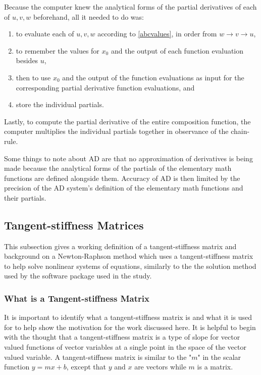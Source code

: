 \documentclass[preprint,12pt]{elsarticle}
\begin{document}
Because the computer knew the analytical forms of the partial derivatives of each of $u,v,w$ beforehand,
all it needed to do was:
\begin{enumerate}
\item to evaluate each of $u,v,w$ according to \ref{abcvalues}, in order from $w \rightarrow
v \rightarrow u$, 
\item to remember the values for $x_0$ and the output of each function evaluation besides  $u$, 
\item then to use $x_0$ and the output of the function evaluations as input for the corresponding partial
derivative function  evaluations, and
\item store the individual partials.
\end{enumerate}
Lastly, to compute the partial derivative of the entire composition function, the computer multiplies
the individual partials together in observance of the chain-rule.  

Some things to note about AD are that no approximation of derivatives is being made because the analytical 
forms of the partials of the elementary math functions are defined alongside them. Accuracy of AD is then limited
by the precision of the AD system's definition of the elementary math functions and their partials.
 
\subsection{Tangent-stiffness Matrices} 

This subsection gives a working definition of a tangent-stiffness matrix and background on a
Newton-Raphson method which uses a tangent-stiffness matrix to help solve nonlinear systems of
equations, similarly to the the solution method used by the software package used in the study.

\subsubsection{What is a Tangent-stiffness Matrix}
\label{tsmat}

It is important to identify what a tangent-stiffness matrix is and what it is used for to help show
the motivation for the work discussed here. It is helpful to begin with the thought that a
tangent-stiffness matrix is a type of slope for vector valued functions of vector variables at
a single point in the space of the vector valued variable. A tangent-stiffness matrix is similar to the
"$m$" in the scalar function $y = mx + b$, except that $y$ and $x$ are vectors while $m$ is
a matrix. \\
\end{document}
